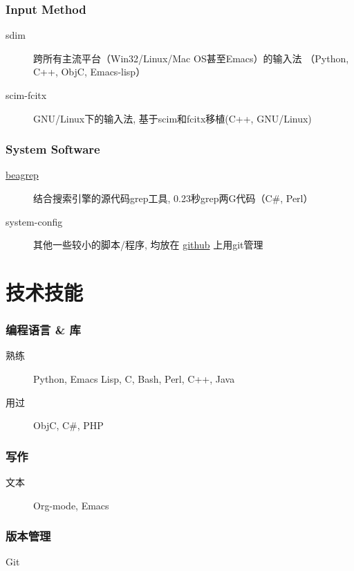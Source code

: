 \documentclass[11pt,dvipdfm,CJKbookmarks]{article}
\begin{document}
\begin{CJK*}{UTF8}{simsun}
\subsubsection{Input Method}
\label{sec-2-0-3}
\begin{description}
\item[sdim] 跨所有主流平台（Win32/Linux/Mac OS甚至Emacs）的输入法
（Python, C++, ObjC, Emacs-lisp）

\item[scim-fcitx] GNU/Linux下的输入法, 基于scim和fcitx移植(C++,
GNU/Linux)
\end{description}
\subsubsection{System Software}
\label{sec-2-0-4}
\begin{description}
\item[\href{https://github.com/baohaojun/beagrep}{beagrep}] 结合搜索引擎的源代码grep工具, 0.23秒grep两G代码（C\#,
Perl）

\item[system-config] 其他一些较小的脚本/程序, 均放在 \href{https://github.com/baohaojun}{github} 上用git管理
\end{description}

\section{技术技能}
\label{sec-3}

\subsubsection{编程语言 \& 库}
\label{sec-3-0-1}
\begin{description}
\item[熟练] Python, Emacs Lisp, C, Bash, Perl, C++, Java

\item[用过] ObjC, C\#, PHP
\end{description}

\subsubsection{写作}
\label{sec-3-0-2}
\begin{description}
\item[文本] Org-mode, Emacs
\end{description}

\subsubsection{版本管理}
\label{sec-3-0-3}
Git


\end{CJK*}
\end{document}
